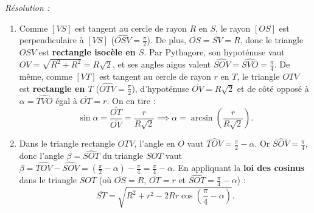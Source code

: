 \begin{exemple}
\emph{Résolution :}
\begin{enumerate}
    \item Comme $[VS]$ est tangent au cercle de rayon $R$ en $S$, le rayon $[OS]$ est perpendiculaire à $[VS]$ ($\widehat{OSV} = \frac{\pi}{2}$). De plus, $\overline{OS} = \overline{SV} = R$, donc le triangle $OSV$ est \textbf{rectangle isocèle en $S$}. Par Pythagore, son hypoténuse vaut $\overline{OV} = \sqrt{R^2 + R^2} = R\sqrt{2}$, et ses angles aigus valent $\widehat{SOV} = \widehat{SVO} = \frac{\pi}{4}$.
    De même, comme $[VT]$ est tangent au cercle de rayon $r$ en $T$, le triangle $OTV$ est \textbf{rectangle en $T$} ($\widehat{OTV} = \frac{\pi}{2}$), d'hypoténuse $\overline{OV} = R\sqrt{2}$ et de côté opposé à $\alpha = \widehat{TVO}$ égal à $\overline{OT} = r$. On en tire :
    \[
        \sin\alpha = \frac{\overline{OT}}{\overline{OV}} = \frac{r}{R\sqrt{2}} \implies \boxed{\alpha = \arcsin\left(\frac{r}{R\sqrt{2}}\right)}.
    \]
    \item Dans le triangle rectangle $OTV$, l'angle en $O$ vaut $\widehat{TOV} = \frac{\pi}{2} - \alpha$. Or $\widehat{SOV} = \frac{\pi}{4}$, donc l'angle $\beta = \widehat{SOT}$ du triangle $SOT$ vaut $\beta = \widehat{TOV} - \widehat{SOV} = \left(\frac{\pi}{2} - \alpha\right) - \frac{\pi}{4} = \frac{\pi}{4} - \alpha$. En appliquant la \textbf{loi des cosinus} dans le triangle $SOT$ (où $\overline{OS} = R$, $\overline{OT} = r$ et $\widehat{SOT} = \frac{\pi}{4} - \alpha$) :
    \[
        \boxed{\overline{ST} = \sqrt{R^2 + r^2 - 2Rr\cos\left(\frac{\pi}{4} - \alpha\right)}}.
    \]
\end{enumerate}
\end{exemple}

